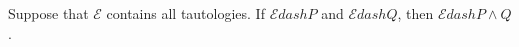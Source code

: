 Suppose that $\mathcal{E}$ contains all tautologies. If $\mathcal{E} dash P$ and $\mathcal{E} dash Q$, then $\mathcal{E} dash P \wedge Q$.
